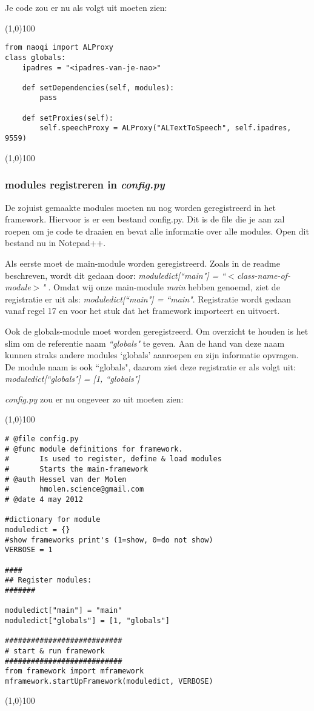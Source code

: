 \documentclass[a4paper]{article}
\begin{document}
Je code zou er nu als volgt uit moeten zien:

\noindent \line(1,0){100}
\begin{verbatim}
from naoqi import ALProxy
class globals:
    ipadres = "<ipadres-van-je-nao>"

    def setDependencies(self, modules):
        pass

    def setProxies(self):
        self.speechProxy = ALProxy("ALTextToSpeech", self.ipadres, 9559)
\end{verbatim}
\noindent \line(1,0){100}

\subsubsection{modules registreren in \textit{config.py}}
De zojuist gemaakte modules moeten nu nog worden geregistreerd in het framework. Hiervoor is er een bestand config.py. Dit is de file die je aan zal roepen om je code te draaien en bevat alle informatie over alle modules. Open dit bestand nu in Notepad++.

Als eerste moet de main-module worden geregistreerd. Zoals in de readme beschreven, wordt dit gedaan door:
 \textit{moduledict[``main"] = ``$<$class-name-of-module$>$" }. 
Omdat wij onze main-module \textit{main} hebben genoemd, ziet de registratie er uit als: \textit{moduledict[``main"] = ``main"}.
Registratie wordt gedaan vanaf regel 17 en voor het stuk dat het framework importeert en uitvoert.

Ook de globals-module moet worden geregistreerd. Om overzicht te houden is het slim om de referentie naam \textit{``globals"} te geven. Aan de hand van deze naam kunnen straks andere modules `globals' aanroepen en zijn informatie opvragen. De module naam is ook ``globals", daarom ziet deze registratie er als volgt uit: \textit{moduledict[``globals"] = [1, ``globals"]}


\textit{config.py} zou er nu ongeveer zo uit moeten zien:

\noindent \line(1,0){100}
\begin{verbatim}
# @file config.py
# @func module definitions for framework. 
#       Is used to register, define & load modules 
#       Starts the main-framework
# @auth Hessel van der Molen
#       hmolen.science@gmail.com
# @date 4 may 2012

#dictionary for module
moduledict = {}
#show frameworks print's (1=show, 0=do not show)
VERBOSE = 1

####
## Register modules:
#######

moduledict["main"] = "main"
moduledict["globals"] = [1, "globals"]

###########################
# start & run framework
###########################
from framework import mframework
mframework.startUpFramework(moduledict, VERBOSE)
\end{verbatim}
\noindent \line(1,0){100}
\end{document}
